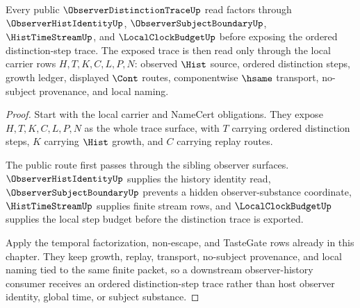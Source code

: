 \begin{theorem}
\label{thm:observer-distinction-trace-public-route}
Every public $\ObserverDistinctionTraceUp$ read factors through $\ObserverHistIdentityUp$, $\ObserverSubjectBoundaryUp$, $\HistTimeStreamUp$, and $\LocalClockBudgetUp$ before exposing the ordered distinction-step trace. The exposed trace is then read only through the local carrier rows $H,T,K,C,L,P,N$: observed $\Hist$ source, ordered distinction steps, growth ledger, displayed $\Cont$ routes, componentwise $\hsame$ transport, no-subject provenance, and local naming.
\end{theorem}
\begin{proof}
Start with the local carrier and NameCert obligations. They expose $H,T,K,C,L,P,N$ as the whole trace surface, with $T$ carrying ordered distinction steps, $K$ carrying $\Hist$ growth, and $C$ carrying replay routes.

The public route first passes through the sibling observer surfaces. $\ObserverHistIdentityUp$ supplies the history identity read, $\ObserverSubjectBoundaryUp$ prevents a hidden observer-substance coordinate, $\HistTimeStreamUp$ supplies finite stream rows, and $\LocalClockBudgetUp$ supplies the local step budget before the distinction trace is exported.

Apply the temporal factorization, non-escape, and TasteGate rows already in this chapter. They keep growth, replay, transport, no-subject provenance, and local naming tied to the same finite packet, so a downstream observer-history consumer receives an ordered distinction-step trace rather than host observer identity, global time, or subject substance.
\end{proof}

